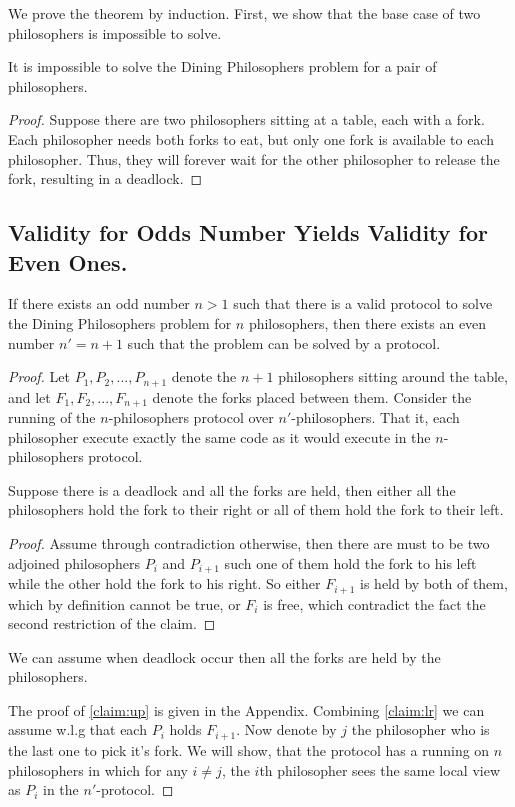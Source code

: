 \documentclass[manuscript,screen,review]{acmart}
\begin{document}
  We prove the theorem by induction. First, we show that the base case of two philosophers is impossible to solve.

\begin{claim}
  It is impossible to solve the Dining Philosophers problem for a pair of philosophers.
\end{claim}
\begin{proof} 
  Suppose there are two philosophers sitting at a table, each with a fork. Each philosopher needs both forks to eat, but only one fork is available to each philosopher. Thus, they will forever wait for the other philosopher to release the fork, resulting in a deadlock.
\end{proof}

\subsection{Validity for Odds Number Yields Validity for Even Ones.}  

\begin{lemma} If there exists an odd number $n > 1$ such that there is a valid protocol to solve the Dining Philosophers problem for $n$ philosophers, then there exists an even number $n' = n+1$ such that the problem can be solved by a protocol.
\end{lemma}
\begin{proof}
  Let $P_1, P_2, ..., P_{n+1}$ denote the $n+1$ philosophers sitting around the table, and let $F_1, F_2, ..., F_{n+1}$ denote the forks placed between them. Consider the running of the $n$-philosophers protocol over $n'$-philosophers. That it, each philosopher execute exactly the same code as it would execute in the $n$-philosophers protocol. 

  \begin{claim} \label{claim:lr} 
Suppose there is a deadlock and all the forks are held, then either all the philosophers hold the fork to their right or all of them hold the fork to their left.
  \end{claim} 
  \begin{proof}
    Assume through contradiction otherwise, then there are must to be two adjoined philosophers $P_{i}$ and $P_{i+1}$ such one of them hold the fork to his left while the other hold the fork to his right. So either $F_{i+1}$ is held by both of them, which by definition cannot be true, or $F_{i}$ is free, which contradict the fact the second restriction of the claim. 
  \end{proof}
  \begin{claim} \label{claim:up} 
    We can assume when deadlock occur then all the forks are held by the philosophers. 
  \end{claim} 
  The proof of \cref{claim:up} is given in the Appendix. Combining \cref{claim:lr} we can assume w.l.g that each $P_{i}$ holds $F_{i+1}$. Now denote by $j$ the philosopher who is the last one to pick it's fork. We will show, that the protocol has a running on $n$ philosophers in which for any $i\neq j$, the $i$th philosopher sees the same local view as $P_{i}$ in the $n'$-protocol.  
\end{proof}
\end{document}

